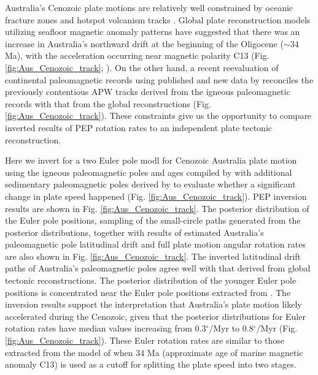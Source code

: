 \documentclass[11pt,letterpaper]{article}
\begin{document}
Australia's Cenozoic plate motions are relatively well constrained by oceanic fracture zones and hotspot volcanism tracks \citep{Muller2016a}. Global plate reconstruction models utilizing seafloor magnetic anomaly patterns have suggested that there was an increase in Australia's northward drift at the beginning of the Oligocene ($\sim$34 Ma), with the acceleration occurring near magnetic polarity C13 (Fig. \ref{fig:Aus_Cenozoic_track}; \citep{Tikku1999a}). On the other hand, a recent reevaluation of continental paleomagnetic records using published and new data by \cite{Hansma2019a} reconciles the previously contentious APW tracks derived from the igneous paleomagnetic records \citep{Idnurm1985a, Idnurm1994a, Musgrave1989a, Opdyke2004a, Hansma2018a} with that from the global reconstructions (Fig. \ref{fig:Aus_Cenozoic_track}). These constraints give us the opportunity to compare inverted results of PEP rotation rates to an independent plate tectonic reconstruction.

Here we invert for a two Euler pole modl for Cenozoic Australia plate motion using the igneous paleomagnetic poles and ages compiled by \cite{Hansma2019a} with additional sedimentary paleomagnetic poles derived by \cite{Idnurm1985a} to evaluate whether a significant change in plate speed happened (Fig. \ref{fig:Aus_Cenozoic_track}). PEP inversion results are shown in Fig. \ref{fig:Aus_Cenozoic_track}. The posterior distribution of the Euler pole positions, sampling of the small-circle paths generated from the posterior distributions, together with results of estimated Australia's paleomagnetic pole latitudinal drift and full plate motion angular rotation rates are also shown in Fig. \ref{fig:Aus_Cenozoic_track}. The inverted latitudinal drift paths of Australia's paleomagnetic poles agree well with that derived from global tectonic reconstructions. The posterior distribution of the younger Euler pole positions is concentrated near the Euler pole positions extracted from \cite{Muller2016a}. The inversion results support the interpretation that Australia's plate motion likely accelerated during the Cenozoic, given that the posterior distributions for Euler rotation rates have median values increasing from 0.3$^\circ$/Myr to 0.8$^\circ$/Myr (Fig. \ref{fig:Aus_Cenozoic_track}). These Euler rotation rates are similar to those extracted from the model of \cite{Muller2016a} when 34 Ma (approximate age of marine magnetic anomaly C13) is used as a cutoff for splitting the plate speed into two stages. 
\end{document}
